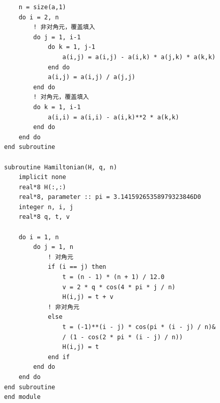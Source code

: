 \documentclass{ctexart}
\begin{document}
\begin{lstlisting}
	n = size(a,1)
	do i = 2, n
		! 非对角元，覆盖填入
		do j = 1, i-1
			do k = 1, j-1
				a(i,j) = a(i,j) - a(i,k) * a(j,k) * a(k,k)
			end do
			a(i,j) = a(i,j) / a(j,j)
		end do
		! 对角元，覆盖填入
		do k = 1, i-1
			a(i,i) = a(i,i) - a(i,k)**2 * a(k,k)
		end do
	end do
end subroutine

subroutine Hamiltonian(H, q, n)
	implicit none
	real*8 H(:,:)
	real*8, parameter :: pi = 3.14159265358979323846D0
	integer n, i, j
	real*8 q, t, v

	do i = 1, n
		do j = 1, n
			! 对角元
			if (i == j) then
				t = (n - 1) * (n + 1) / 12.0
				v = 2 * q * cos(4 * pi * j / n)
				H(i,j) = t + v
			! 非对角元
			else
				t = (-1)**(i - j) * cos(pi * (i - j) / n)&
				/ (1 - cos(2 * pi * (i - j) / n))
				H(i,j) = t
			end if
		end do
	end do
end subroutine
end module
\end{lstlisting}
\newpage
\end{document}
